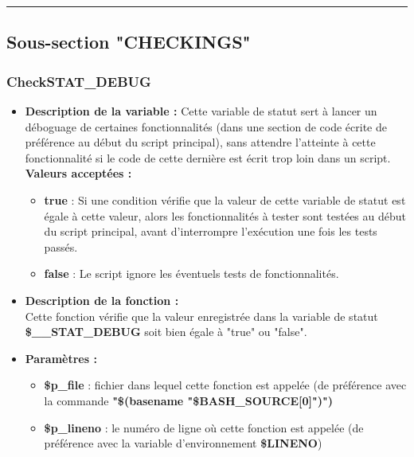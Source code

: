 \documentclass[a4paper,10pt]{article}
\begin{document}
\color{green}\par\noindent\rule{\textwidth}{0.4pt}\color{white}

\color{green}
\subsection{Sous-section "CHECKINGS"}

\color{blue}
\subsubsection{CheckSTAT\_DEBUG}\color{white}
\begin{itemize}
    \item \textbf{Description de la variable :} Cette variable de statut sert à lancer un déboguage de certaines fonctionnalités (dans une section de code écrite de préférence au début du script principal), sans attendre l'atteinte à cette fonctionnalité si le code de cette dernière est écrit trop loin dans un script.\\[1\baselineskip]
    
    \textbf{Valeurs acceptées :}
    \begin{itemize}
        \item \textbf{true} : Si une condition vérifie que la valeur de cette variable de statut est égale à cette valeur, alors les fonctionnalités à tester sont testées au début du script principal, avant d'interrompre l'exécution une fois les tests passés.
        \item \textbf{false} : Le script ignore les éventuels tests de fonctionnalités.\\[1\baselineskip]
    \end{itemize}

    \item \textbf{Description de la fonction :}\\
        Cette fonction vérifie que la valeur enregistrée dans la variable de statut \textbf{\color{orange}\$\_\_STAT\_DEBUG} soit bien égale à "true" ou "false".\\[1\baselineskip]

    \item \textbf{Paramètres :}
    \begin{itemize}
        \item \color{orange}\textbf{\$p\_file}\color{white} : fichier dans lequel cette fonction est appelée (de préférence avec la commande \textbf{"\$(\color{gray}basename \color{white}"\color{orange}\$BASH\_SOURCE[0]\color{white}")")}\\[1\baselineskip]
        \item \color{orange}\textbf{\$p\_lineno}\color{white} : le numéro de ligne où cette fonction est appelée (de préférence avec la variable d'environnement \textbf{\color{orange}\$LINENO})\\[1\baselineskip]
    \end{itemize}


\end{itemize}
\end{document}
